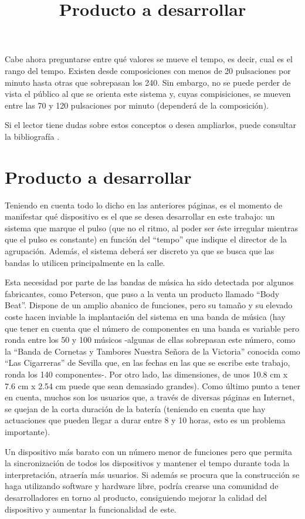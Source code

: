 Cabe ahora preguntarse entre qué valores se mueve el tempo, es decir, cual es el rango
del tempo. Existen desde composiciones con menos de 20 pulsaciones por minuto hasta
otras que sobrepasan los 240. Sin embargo, no se puede perder de vista
el público al que se orienta este sistema y, cuyas compisiciones, se mueven entre las 70 y 120 pulsaciones
por minuto (dependerá de la composición).

Si el lector tiene dudas sobre estos conceptos o desea ampliarlos, puede consultar la bibliografía \cite{teorMusica} \cite{lenguajeMusical}.


\title{Producto a desarrollar}
\section{Producto a desarrollar}

Teniendo en cuenta todo lo dicho en las anteriores páginas, es el momento de manifestar qué dispositivo es el que se desea desarrollar en este trabajo: un sistema que marque el pulso (que no el ritmo, al poder ser éste irregular mientras que el pulso es constante) en función del “tempo” que indique el director de la agrupación. Además, el sistema deberá ser discreto ya que se busca que las bandas lo utilicen principalmente en la calle.

Esta necesidad por parte de las bandas de música ha sido detectada por algunos fabricantes, como Peterson, que puso a la venta un producto llamado “Body Beat”. Dispone de un amplio abanico de funciones, pero su tamaño y su elevado coste hacen inviable la implantación del sistema en una banda de música (hay que tener en cuenta que el número de componentes en una banda es variable pero ronda entre los 50 y 100 músicos -algunas de ellas sobrepasan este número, como la “Banda de Cornetas y Tambores Nuestra Señora de la Victoria” conocida como “Las Cigarreras” de Sevilla \cite{cigarreras} que, en las fechas en las que se escribe este trabajo, ronda los 140 componentes-. Por otro lado, las dimensiones, de unos 10.8 cm x 7.6 cm x 2.54 cm puede que sean demasiado grandes). Como último punto a tener en cuenta, muchos son los usuarios que, a través de diversas páginas en Internet, se quejan de la corta duración de la batería (teniendo en cuenta que hay actuaciones que pueden llegar a durar entre 8 y 10 horas, esto es un problema importante).

Un dispositivo más barato con un número menor de funciones pero que permita la sincronización de todos los dispositivos y mantener el tempo durante toda la interpretación, atraería más usuarios. Si además se procura que la construcción se haga utilizando software y hardware libre, podría crearse una comunidad de desarrolladores en torno al producto, consiguiendo mejorar la calidad del dispositivo y aumentar la funcionalidad de este.
